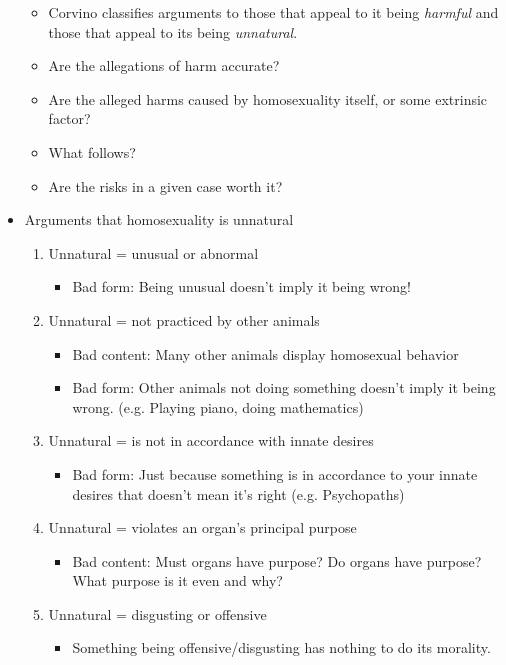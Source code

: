 \documentclass{article}
\begin{document}
\begin{spacing}{1.2}
\begin{itemize}
        \begin{itemize}
            \item Corvino classifies arguments to those that appeal to it being \emph{harmful} and those that appeal to its being \emph{unnatural}.
            \item Are the allegations of harm accurate?
            \item Are the alleged harms caused by homosexuality itself, or some extrinsic factor?
            \item What follows?
            \item Are the risks in a given case worth it?
        \end{itemize}
        \item Arguments that homosexuality is unnatural
        \begin{enumerate}
            \item Unnatural = unusual or abnormal
            \begin{itemize}
                \item Bad form: Being unusual doesn't imply it being wrong!
            \end{itemize}
            \item Unnatural = not practiced by other animals
            \begin{itemize}
                \item Bad content: Many other animals display homosexual behavior
                \item Bad form: Other animals not doing something doesn't imply it being wrong. (e.g. Playing piano, doing mathematics)
            \end{itemize}
            \item Unnatural = is not in accordance with innate desires
            \begin{itemize}
                \item Bad form: Just because something is in accordance to your innate desires that doesn't mean it's right (e.g. Psychopaths)
            \end{itemize}
            \item Unnatural = violates an organ's principal purpose
            \begin{itemize}
                \item Bad content: Must organs have purpose? Do organs have purpose? What purpose is it even and why?
            \end{itemize}
            \item Unnatural = disgusting or offensive
            \begin{itemize}
                \item Something being offensive/disgusting has nothing to do its morality.
            \end{itemize}
        \end{enumerate}
    \end{itemize}
\end{spacing}
\end{document}
